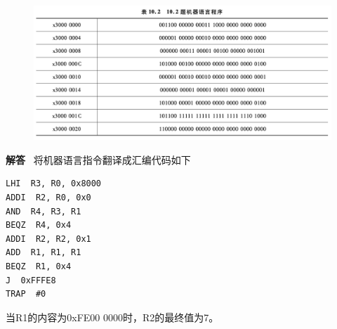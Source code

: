 \documentclass[10pt,a4paper,UTF8]{ctexart}
\newenvironment{solution}{\par\noindent\textbf{解答}\ }{\par}
\begin{document}
\begin{figure}[H]
	\centering
	\includegraphics[scale=0.5]{img/10.2}
\end{figure}

\begin{solution}
	将机器语言指令翻译成汇编代码如下
	\begin{lstlisting}
LHI  R3, R0, 0x8000
ADDI  R2, R0, 0x0
AND  R4, R3, R1
BEQZ  R4, 0x4
ADDI  R2, R2, 0x1
ADD  R1, R1, R1
BEQZ  R1, 0x4
J  0xFFFE8
TRAP  #0	
	\end{lstlisting}

	当R1的内容为0xFE00 0000时，R2的最终值为7。
\end{solution}
\end{document}
